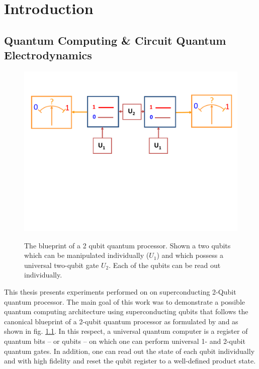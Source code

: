 \chapter{Introduction}


\section{Quantum Computing \& Circuit Quantum Electrodynamics}

\begin{figure}
	\centering
		\includegraphics[width=1.\textwidth]{./material/papers/grover/submission1/Fig1}
	\label{fig:Grover1}
	\caption{The blueprint of a 2 qubit quantum processor. Shown a two qubits which can be manipulated individually ($U_1$) and which possess a universal two-qubit gate $U_2$. Each of the qubits can be read out individually.}
\end{figure}

This thesis presents experiments performed on on superconducting 2-Qubit quantum processor. The main goal of this work was to demonstrate a possible quantum computing architecture using superconducting qubits that follows the canonical blueprint of a 2-qubit quantum processor as formulated by \cite{divincenzo_physical_2000} and as shown in fig. \ref{fig:Grover1}. In this respect, a universal quantum computer is a register of quantum bits -- or qubits -- on which one can perform universal 1- and 2-qubit quantum gates. In addition, one can read out the state of each qubit individually and with high fidelity and reset the qubit register to a well-defined product state.

